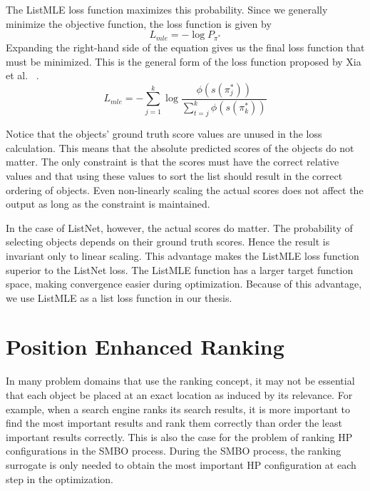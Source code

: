 \documentclass[12pt, twoside, ngerman]{report}
\begin{document}
The ListMLE loss function maximizes this probability.
Since we generally minimize the objective function, the loss function is given by
\begin{equation}
L_{mle} = - \log P_{\pi^*}
\end{equation}
Expanding the right-hand side of the equation gives us the final loss function that must be minimized.
This is the general form of the loss function proposed by Xia et al. ~\cite{listmlepaper}.
\begin{equation}
L_{mle} = -  \sum\limits_{j=1}^{k} \log \frac{\phi(s(\pi^*_j))}{ \sum\limits_{t=j}^k \phi(s(\pi^*_k))}
\end{equation}


Notice that the objects' ground truth score values are unused in the loss calculation.
This means that the absolute predicted scores of the objects do not matter.
The only constraint is that the scores must have the correct relative values and that using these values to sort the list should result in the correct ordering of objects.
Even non-linearly scaling the actual scores does not affect the output as long as the constraint is maintained.

In the case of ListNet,  however,  the actual scores do matter.
The probability of selecting objects depends on their ground truth scores.
Hence the result is invariant only to linear scaling.
This advantage makes the ListMLE loss function superior to the ListNet loss. The ListMLE function has a larger target function space, making convergence easier during optimization.
Because of this advantage, we use ListMLE as a list loss function in our thesis.


\section{Position Enhanced Ranking}\label{sec:positionEnhancedRanking}

In many problem domains that use the ranking concept,  it may not be essential that each object be placed at an exact location as induced by its relevance.
For example,  when a search engine ranks its search results, it is more important to find the most important results and rank them correctly than order the least important results correctly.
This is also the case for the problem of ranking HP configurations in the SMBO process.
During the SMBO process, the ranking surrogate is only needed to obtain the most important HP configuration at each step in the optimization.
\end{document}
